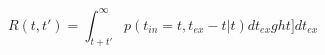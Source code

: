\begin{equation}
R(t,t') = \int_{t+t'}^\infty p(t_{in}=t,t_{ex}-t|t) dt_{ex}  ght]  dt_{ex}
\end{equation}
